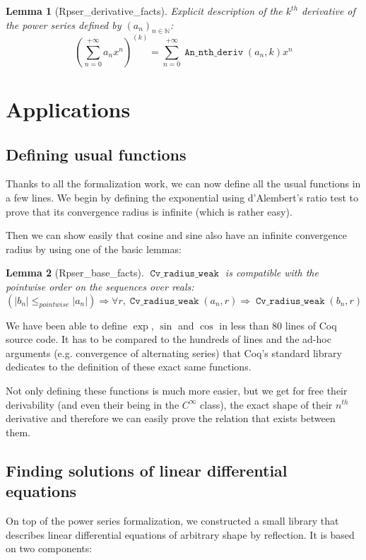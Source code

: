 \documentclass[submission,copyright]{eptcs}
\newcommand{\coq}{Coq}
\newcommand{\N}{\mathbb{N}}
\DeclareMathOperator{\Dn}{\mathtt{An\_nth\_deriv}}
\DeclareMathOperator{\cvrw}{\mathtt{Cv\_radius\_weak}}
\newtheorem{lemma}{Lemma}
\begin{document}
\begin{lemma}[Rpser\_derivative\_facts] Explicit description of
the $k^{th}$ derivative of the power series defined by $(a_n)_{n\in \N}$:
$$(\sum_{n=0}^{+\infty} a_n x^n)^{(k)} = \sum_{n=0}^{+\infty}
\Dn{}(a_n,k) x^n$$\end{lemma}

\section{Applications}

\subsection{Defining usual functions}

Thanks to all the formalization work, we can now define all the usual
functions in a few lines. We begin by defining the exponential using
d'Alembert's ratio test to prove that its convergence radius is infinite
(which is rather easy).

Then we can show easily that cosine and sine also have an infinite
convergence radius by using one of the basic lemmas:

\begin{lemma}[Rpser\_base\_facts] $\cvrw{}$ is compatible with the
pointwise order on the sequences over reals:
$$\left(\left|b_n\right| \le_{pointwise} \left|a_n\right|\right)
  \Rightarrow \forall r, \cvrw{}(a_n,r) \Rightarrow \cvrw{}(b_n,r)$$
\end{lemma}

We have been able to define $\exp$, $\sin$ and $\cos$ in less than 80
lines of \coq{} source code. It has to be compared to the hundreds
of lines and the ad-hoc arguments (e.g. convergence of alternating series)
that \coq{}'s standard library dedicates to the definition of these exact
same functions.

Not only defining these functions is much more easier, but we get for
free their derivability (and even their being in the $C^{\infty}$ class),
the exact shape of their $n^{th}$ derivative and therefore we can easily
prove the relation that exists between them.

\subsection{Finding solutions of linear differential equations}

On top of the power series formalization, we constructed a small library
that describes linear differential equations of arbitrary shape by
reflection. It is based on two components:
\end{document}
